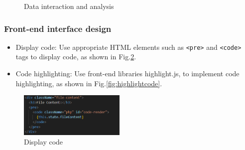 \documentclass[journal]{IEEEtran}
\begin{document}
\begin{figure} 
  \centering
{}
  \hfill
{}
\caption{Data interaction and analysis}
\label{fig:datainteana} 
\end{figure}

\subsubsection{Front-end interface design}

\begin{itemize}
  \item Display code: Use appropriate HTML elements such as \verb|<pre>| and \verb|<code>| tags to display code, as shown in Fig.\ref{fig:displaycode}.
  \item Code highlighting: Use front-end libraries highlight.js, to implement code highlighting, as shown in Fig.\ref{fig:highlightcode}. 
\end{itemize}

\begin{figure}[h]
  \centering
  \includegraphics[width=2in]{figures/displaycode.png}
  \caption{Display code}
  \label{fig:displaycode}
  \end{figure}
\end{document}
